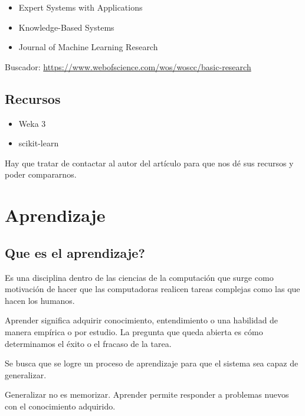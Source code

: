 \documentclass[11pt,letterpaper]{article}
\begin{document}
\begin{itemize}[itemsep=0.1em]
    \item Expert Systems with Applications
    \item Knowledge-Based Systems
    \item Journal of Machine Learning Research
\end{itemize}

Buscador: \url{https://www.webofscience.com/wos/woscc/basic-research}

\subsection*{Recursos}

\begin{itemize}[itemsep=0.1em]
    \item Weka 3
    \item scikit-learn
\end{itemize}

\begin{ojo}
  Hay que tratar de contactar al autor del artículo para que nos dé
  sus recursos y poder compararnos.
\end{ojo}

\newpage


\section{Aprendizaje}

\subsection*{Que es el aprendizaje?}

Es una disciplina dentro de las ciencias de la computación que surge
como motivación de hacer que las computadoras realicen tareas
complejas como las que hacen los humanos.

Aprender significa adquirir conocimiento, entendimiento o una
habilidad de manera empírica o por estudio. La pregunta que queda
abierta es cómo determinamos el éxito o el fracaso de la tarea.

Se busca que se logre un proceso de aprendizaje para que el sistema
sea capaz de generalizar.

\begin{idea}
  Generalizar no es memorizar. Aprender permite responder a problemas
  nuevos con el conocimiento adquirido.
\end{idea}
\end{document}
